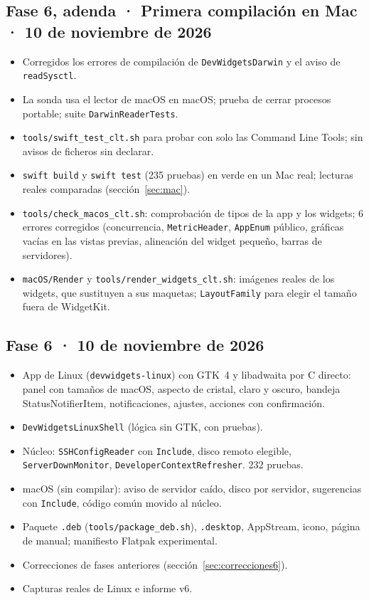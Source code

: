 \documentclass[11pt,a4paper]{article}
\begin{document}
\subsection*{Fase 6, adenda · Primera compilación en Mac · 10 de noviembre de 2026}
\begin{itemize}
  \item Corregidos los errores de compilación de
    \texttt{DevWidgetsDarwin} y el aviso de \texttt{readSysctl}.
  \item La sonda usa el lector de macOS en macOS; prueba de cerrar
    procesos portable; suite \texttt{DarwinReaderTests}.
  \item \texttt{tools/swift\_test\_clt.sh} para probar con solo las
    Command Line Tools; sin avisos de ficheros sin declarar.
  \item \texttt{swift build} y \texttt{swift test} (235 pruebas) en verde
    en un Mac real; lecturas reales comparadas
    (sección~\ref{sec:mac}).
  \item \texttt{tools/check\_macos\_clt.sh}: comprobación de tipos de
    la app y los widgets; 6 errores corregidos (concurrencia,
    \texttt{MetricHeader}, \texttt{AppEnum} público, gráficas vacías
    en las vistas previas, alineación del widget pequeño, barras de
    servidores).
  \item \texttt{macOS/Render} y \texttt{tools/render\_widgets\_clt.sh}:
    imágenes reales de los widgets, que sustituyen a sus maquetas;
    \texttt{LayoutFamily} para elegir el tamaño fuera de WidgetKit.
\end{itemize}

\subsection*{Fase 6 · 10 de noviembre de 2026}
\begin{itemize}
  \item App de Linux (\texttt{devwidgets-linux}) con GTK~4 y
    libadwaita por C directo: panel con tamaños de macOS, aspecto de
    cristal, claro y oscuro, bandeja StatusNotifierItem,
    notificaciones, ajustes, acciones con confirmación.
  \item \texttt{DevWidgetsLinuxShell} (lógica sin GTK, con pruebas).
  \item Núcleo: \texttt{SSHConfigReader} con \texttt{Include}, disco
    remoto elegible, \texttt{ServerDownMonitor},
    \texttt{DeveloperContextRefresher}. 232 pruebas.
  \item macOS (sin compilar): aviso de servidor caído, disco por
    servidor, sugerencias con \texttt{Include}, código común movido al
    núcleo.
  \item Paquete \texttt{.deb} (\texttt{tools/package\_deb.sh}),
    \texttt{.desktop}, AppStream, icono, página de manual; manifiesto
    Flatpak experimental.
  \item Correcciones de fases anteriores
    (sección~\ref{sec:correcciones6}).
  \item Capturas reales de Linux e informe v6.
\end{itemize}
\end{document}

